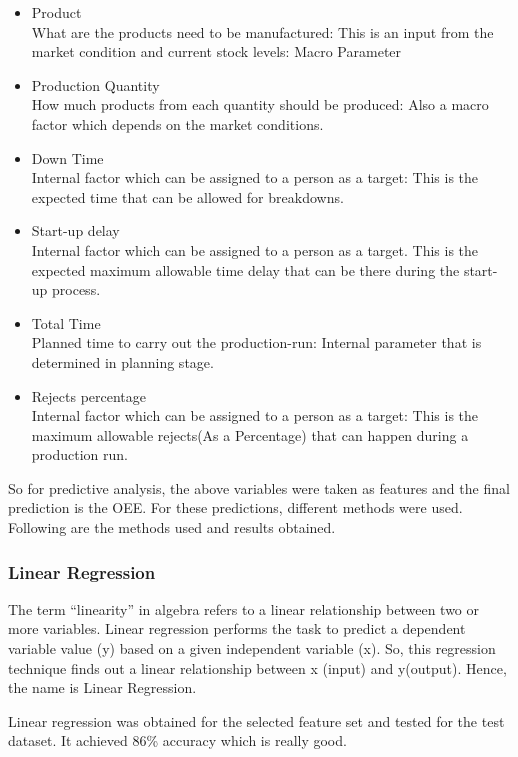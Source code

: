 \begin{itemize}
  \item Product \\
  What are the products need to be manufactured: This is an input from the market condition and current stock levels: Macro Parameter
  \item Production Quantity \\
  How much products from each quantity should be produced: Also a macro factor which depends on the market conditions.
  \item Down Time \\
  Internal factor which can be assigned to a person as a target: This is the expected time that can be allowed for breakdowns.
  \item Start-up delay \\
  Internal factor which can be assigned to a person as a target. This is the expected maximum allowable time delay that can be there during the start-up process.
  \item Total Time \\
  Planned time to carry out the production-run: Internal parameter that is determined in planning stage.
  \item Rejects percentage \\
  Internal factor which can be assigned to a person as a target: This is the maximum allowable rejects(As a Percentage) that can happen during a production run. 
\end{itemize}

So for predictive analysis, the above variables were taken as features and the final prediction is the OEE. For these predictions, different methods were used. Following are the methods used and results obtained. \\
 \renewcommand{\labelitemi}{$\blacksquare$}
 
\subsubsection{Linear Regression}
The term “linearity” in algebra refers to a linear relationship between two or more variables. Linear regression performs the task to predict a dependent variable value (y) based on a given independent variable (x). So, this regression technique finds out a linear relationship between x (input) and y(output). Hence, the name is Linear Regression.

Linear regression was obtained for the selected feature set and tested for the test dataset. It achieved 86\% accuracy which is really good. \\


